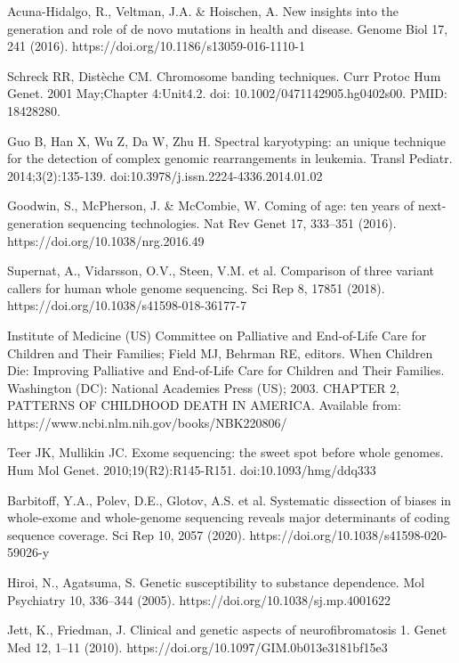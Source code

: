 \documentclass[a4paper,12pt]{article}
\begin{document}
\begin{thebibliography}{300}
Acuna-Hidalgo, R., Veltman, J.A. \& Hoischen, A. New insights into the generation and role of de novo mutations in health and disease. Genome Biol 17, 241 (2016). https://doi.org/10.1186/s13059-016-1110-1

Schreck RR, Distèche CM. Chromosome banding techniques. Curr Protoc Hum Genet. 2001 May;Chapter 4:Unit4.2. doi: 10.1002/0471142905.hg0402s00. PMID: 18428280.

Guo B, Han X, Wu Z, Da W, Zhu H. Spectral karyotyping: an unique technique for the detection of complex genomic rearrangements in leukemia. Transl Pediatr. 2014;3(2):135-139. doi:10.3978/j.issn.2224-4336.2014.01.02

Goodwin, S., McPherson, J. \& McCombie, W. Coming of age: ten years of next-generation sequencing technologies. Nat Rev Genet 17, 333–351 (2016). https://doi.org/10.1038/nrg.2016.49

Supernat, A., Vidarsson, O.V., Steen, V.M. et al. Comparison of three variant callers for human whole genome sequencing. Sci Rep 8, 17851 (2018). https://doi.org/10.1038/s41598-018-36177-7

Institute of Medicine (US) Committee on Palliative and End-of-Life Care for Children and Their Families; Field MJ, Behrman RE, editors. When Children Die: Improving Palliative and End-of-Life Care for Children and Their Families. Washington (DC): National Academies Press (US); 2003. CHAPTER 2, PATTERNS OF CHILDHOOD DEATH IN AMERICA. Available from: https://www.ncbi.nlm.nih.gov/books/NBK220806/

Teer JK, Mullikin JC. Exome sequencing: the sweet spot before whole genomes. Hum Mol Genet. 2010;19(R2):R145-R151. doi:10.1093/hmg/ddq333

Barbitoff, Y.A., Polev, D.E., Glotov, A.S. et al. Systematic dissection of biases in whole-exome and whole-genome sequencing reveals major determinants of coding sequence coverage. Sci Rep 10, 2057 (2020). https://doi.org/10.1038/s41598-020-59026-y

Hiroi, N., Agatsuma, S. Genetic susceptibility to substance dependence. Mol Psychiatry 10, 336–344 (2005). https://doi.org/10.1038/sj.mp.4001622

Jett, K., Friedman, J. Clinical and genetic aspects of neurofibromatosis 1. Genet Med 12, 1–11 (2010). https://doi.org/10.1097/GIM.0b013e3181bf15e3


\end{thebibliography}
\end{document}
